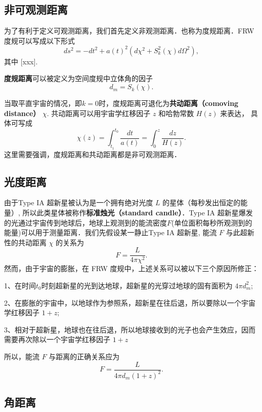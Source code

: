 

\subsection{非可观测距离}
为了有利于定义可观测距离，我们首先定义非观测距离．也称为度规距离．FRW 度规可以写成以下形式
\begin{equation}
ds^2=-dt^2+a(t)^2(d\chi^2+S^2_k (\chi) d\Omega^2),
\end{equation}
其中
[xxx]. %

\textbf{度规距离}可以被定义为空间度规中立体角的因子
\begin{equation}
d_m=S_k(\chi).
\end{equation}

当取平直宇宙的情况，即$k=0$时，度规距离可退化为\textbf{共动距离（comoving distance）} $\chi$. 共动距离可以用宇宙学红移因子 $z$ 和哈勃常数 $H(z)$ 来表达， 具体可写成
\begin{equation}
\chi(z)=\int^{t_0}_{t_1} \frac{dt}{a(t)}=\int^z_0 \frac{dz}{H(z)}.
\end{equation}
这里需要强调，度规距离和共动距离都是非可观测距离．

\subsection{光度距离}
由于Type IA 超新星被认为是一个拥有绝对光度 $L$ 的星体（每秒发出恒定的能量）, 所以此类星体被称作\textbf{标准烛光（standard candle）}．Type IA 超新星爆发的光通过宇宙传到地球后，地球上观测到的能流密度$F$(单位面积每秒所观测到的能量)可以用于测量距离．我们先假设某一静止Type IA 超新星, 能流 $F$ 与此超新性的共动距离 $\chi$ 的关系为
\begin{equation}
F=\frac{L}{4\pi \chi^2}.
\end{equation}
然而，由于宇宙的膨胀，在 FRW 度规中，上述关系可以被以下三个原因所修正：

1、在时间$t_0$时刻超新星的光到达地球，超新星的光穿过地球的固有面积为 $4\pi d_m^2$;

2、在膨胀的宇宙中，以地球作为参照系，超新星在往后退，所以要除以一个宇宙学红移因子 $1+z$;

3、相对于超新星，地球也在往后退，所以地球接收到的光子也会产生效应，因而需要再次除以一个宇宙学红移因子 $1+z$

所以，能流 $F$ 与距离的正确关系应为
\begin{equation}
F=\frac{L}{4\pi d_m (1+z)^2}.
\end{equation}

\subsection{角距离}